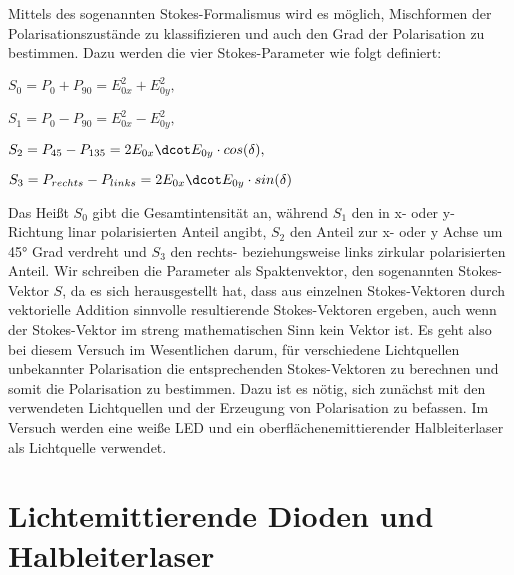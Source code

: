 \documentclass[bigchapter,colorback,accentcolor=tud4b,linedtoc,11pt]{tudreport}
\begin{document}
Mittels des sogenannten Stokes-Formalismus wird es möglich, Mischformen der Polarisationszustände zu klassifizieren und auch den Grad der Polarisation zu bestimmen. Dazu werden die vier Stokes-Parameter wie folgt definiert:

\begin{center}
$S_0=P_{0} + P_{90}=E_{0x}^2 + E_{0y}^2,$\vspace{\baselineskip}

$S_1=P_{0} - P_{90}=E_{0x}^2 - E_{0y}^2,$\vspace{\baselineskip}

$S_2=P_{45} - P_{135}=2E_{0x} \dcot E_{0y} \cdot cos(\delta),$\vspace{\baselineskip}
 
$S_3=P_{rechts} - P_{links}=2E_{0x} \dcot E_{0y} \cdot sin(\delta)$\vspace{\baselineskip}
\end{center}



Das Heißt $S_0$ gibt die Gesamtintensität an, während $S_1$ den in x- oder y- Richtung linar polarisierten Anteil angibt, $S_2$ den Anteil zur x- oder y Achse um 45° Grad verdreht und $S_3$ den rechts- beziehungsweise links zirkular polarisierten Anteil. Wir schreiben die Parameter als Spaktenvektor, den sogenannten Stokes-Vektor $S$, da es sich herausgestellt hat, dass aus einzelnen Stokes-Vektoren durch vektorielle Addition sinnvolle resultierende Stokes-Vektoren ergeben, auch wenn der Stokes-Vektor im streng mathematischen Sinn kein Vektor ist.
Es geht also bei diesem Versuch im Wesentlichen darum, für verschiedene Lichtquellen unbekannter Polarisation die entsprechenden Stokes-Vektoren zu berechnen und somit die Polarisation zu bestimmen. Dazu ist es nötig, sich zunächst mit den verwendeten Lichtquellen und der Erzeugung von Polarisation zu befassen. Im Versuch werden eine weiße LED und ein oberflächenemittierender Halbleiterlaser als Lichtquelle verwendet. 


\section{Lichtemittierende Dioden und Halbleiterlaser}
\end{document}
